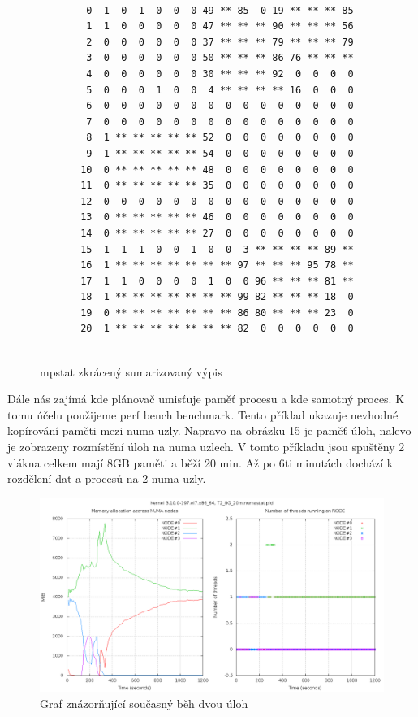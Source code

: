 \documentclass[
  field=ainfk,
  biblatex,
  glossaries,
  index
]{kidiplom}
\begin{document}
\begin{figure}[ht]
\caption{mpstat zkrácený sumarizovaný výpis}
\center
\label{mpstat2}

\begin{Verbatim}[frame=single]

        0  1  0  1  0  0  0 49 ** 85  0 19 ** ** ** 85 
        1  1  0  0  0  0  0 47 ** ** ** 90 ** ** ** 56 
        2  0  0  0  0  0  0 37 ** ** ** 79 ** ** ** 79 
        3  0  0  0  0  0  0 50 ** ** ** 86 76 ** ** ** 
        4  0  0  0  0  0  0 30 ** ** ** 92  0  0  0  0 
        5  0  0  0  1  0  0  4 ** ** ** ** 16  0  0  0 
        6  0  0  0  0  0  0  0  0  0  0  0  0  0  0  0 
        7  0  0  0  0  0  0  0  0  0  0  0  0  0  0  0 
        8  1 ** ** ** ** ** 52  0  0  0  0  0  0  0  0 
        9  1 ** ** ** ** ** 54  0  0  0  0  0  0  0  0 
       10  0 ** ** ** ** ** 48  0  0  0  0  0  0  0  0 
       11  0 ** ** ** ** ** 35  0  0  0  0  0  0  0  0 
       12  0  0  0  0  0  0  0  0  0  0  0  0  0  0  0 
       13  0 ** ** ** ** ** 46  0  0  0  0  0  0  0  0 
       14  0 ** ** ** ** ** 27  0  0  0  0  0  0  0  0 
       15  1  1  1  0  0  1  0  0  3 ** ** ** ** 89 ** 
       16  1 ** ** ** ** ** ** ** 97 ** ** ** 95 78 ** 
       17  1  1  0  0  0  0  1  0  0 96 ** ** ** 81 ** 
       18  1 ** ** ** ** ** ** ** 99 82 ** ** ** 18  0 
       19  0 ** ** ** ** ** ** ** 86 80 ** ** ** 23  0 
       20  1 ** ** ** ** ** ** ** 82  0  0  0  0  0  0 
      
\end{Verbatim}
\end{figure}
\newpage

Dále nás zajímá kde plánovač umisťuje paměť procesu a kde samotný proces. K tomu účelu použijeme perf bench benchmark. Tento příklad ukazuje nevhodné kopírování paměti mezi numa uzly. Napravo na obrázku 15 je paměť úloh, nalevo je zobrazeny rozmístění úloh na numa uzlech. V tomto příkladu jsou spuštěny 2 vlákna celkem mají 8GB paměti a běží 20 min. Až po 6ti minutách dochází k rozdělení dat a procesů na 2 numa uzly. 

\begin{figure}[ht]
\includegraphics[scale=0.30]{obrazky/PerfBenchResult.png}
\caption{Graf znázorňující současný běh dvou úloh}
\label{PerfBenchResult}
\end{figure}
\end{document}
